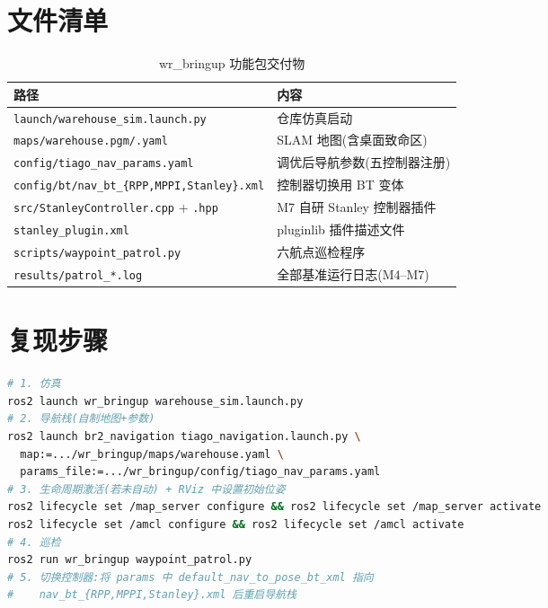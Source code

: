 \documentclass[12pt, a4paper]{ctexart}
\begin{document}
\appendix
\section{文件清单}\label{app:files}
\begin{table}[H]
\centering
\begin{tabular}{lp{9.5cm}}
\toprule
路径 & 内容 \\
\midrule
\texttt{launch/warehouse\_sim.launch.py} & 仓库仿真启动 \\
\texttt{maps/warehouse.pgm/.yaml} & SLAM 地图(含桌面致命区) \\
\texttt{config/tiago\_nav\_params.yaml} & 调优后导航参数(五控制器注册) \\
\texttt{config/bt/nav\_bt\_\{RPP,MPPI,Stanley\}.xml} & 控制器切换用 BT 变体 \\
\texttt{src/StanleyController.cpp} + \texttt{.hpp} & M7 自研 Stanley 控制器插件 \\
\texttt{stanley\_plugin.xml} & pluginlib 插件描述文件 \\
\texttt{scripts/waypoint\_patrol.py} & 六航点巡检程序 \\
\texttt{results/patrol\_*.log} & 全部基准运行日志(M4--M7) \\
\hline
\end{tabular}
\caption{wr\_bringup 功能包交付物}
\end{table}

\section{复现步骤}
\begin{lstlisting}[language=bash]
# 1. 仿真
ros2 launch wr_bringup warehouse_sim.launch.py
# 2. 导航栈(自制地图+参数)
ros2 launch br2_navigation tiago_navigation.launch.py \
  map:=.../wr_bringup/maps/warehouse.yaml \
  params_file:=.../wr_bringup/config/tiago_nav_params.yaml
# 3. 生命周期激活(若未自动) + RViz 中设置初始位姿
ros2 lifecycle set /map_server configure && ros2 lifecycle set /map_server activate
ros2 lifecycle set /amcl configure && ros2 lifecycle set /amcl activate
# 4. 巡检
ros2 run wr_bringup waypoint_patrol.py
# 5. 切换控制器:将 params 中 default_nav_to_pose_bt_xml 指向
#    nav_bt_{RPP,MPPI,Stanley}.xml 后重启导航栈
\end{lstlisting}
\end{document}
